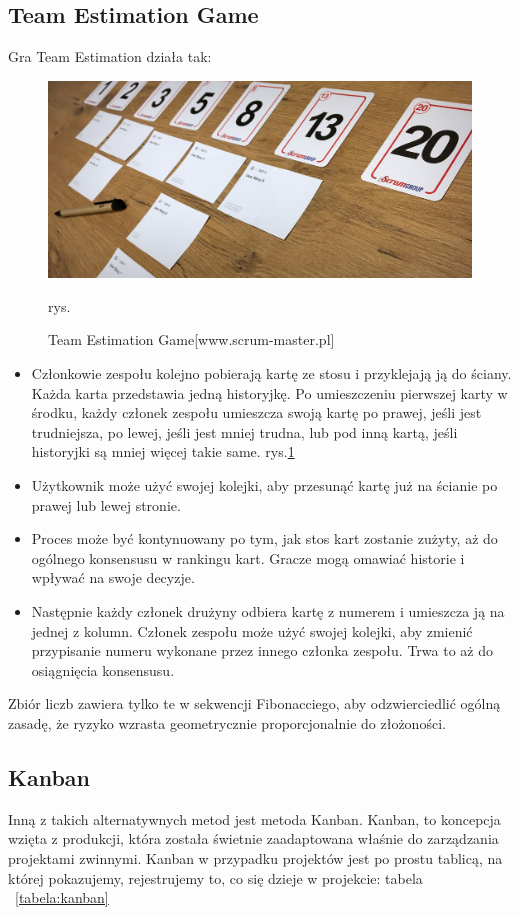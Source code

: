 \subsection{Team Estimation Game}

Gra Team Estimation działa tak:

\begin{figure}
	\centering\includegraphics[width=.4\textwidth]{img/team_estimation_game}
	\caption{Team Estimation Game[www.scrum-master.pl]}
	rys.\label{rys:teamEstimationGame}
\end{figure}

\begin{itemize}
	\item Członkowie zespołu kolejno pobierają kartę ze stosu i przyklejają ją do ściany. Każda karta przedstawia jedną historyjkę.
	Po umieszczeniu pierwszej karty w środku, każdy członek zespołu umieszcza swoją kartę po prawej, jeśli jest trudniejsza, po lewej, jeśli jest mniej trudna,
	lub pod inną kartą, jeśli historyjki są mniej więcej takie same.
	rys.\ref{rys:teamEstimationGame}
	\item Użytkownik może użyć swojej kolejki, aby przesunąć kartę już na ścianie po prawej lub lewej stronie.
	\item Proces może być kontynuowany po tym, jak stos kart zostanie zużyty, aż do ogólnego konsensusu w rankingu kart. Gracze mogą omawiać historie i wpływać na swoje decyzje.
	\item Następnie każdy członek drużyny odbiera kartę z numerem i umieszcza ją na jednej z kolumn. Członek zespołu może użyć swojej kolejki, aby zmienić przypisanie numeru wykonane przez innego członka zespołu. Trwa to aż do osiągnięcia konsensusu.
\end{itemize}

Zbiór liczb zawiera tylko te w sekwencji Fibonacciego, aby odzwierciedlić ogólną zasadę, że ryzyko wzrasta geometrycznie proporcjonalnie do złożoności.

\subsection{Kanban}

Inną z takich alternatywnych metod jest metoda Kanban. Kanban,
to koncepcja wzięta z produkcji, która została świetnie zaadaptowana właśnie do zarządzania projektami zwinnymi.
Kanban w przypadku projektów jest po prostu tablicą, na której pokazujemy, rejestrujemy to, co się dzieje w projekcie: tabela
~\ref{tabela:kanban}

